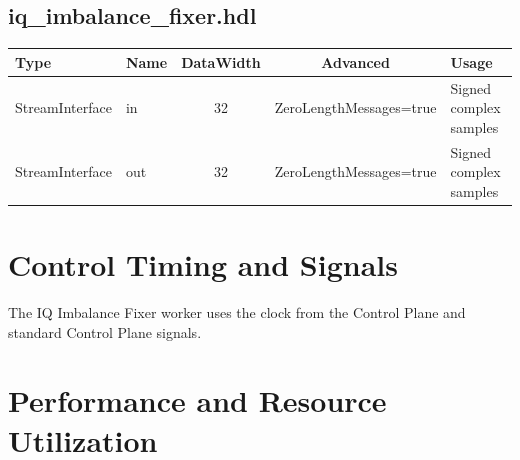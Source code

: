 \documentclass{article}
\def\comp{iq\_imbalance\_fixer}
\begin{document}
\begin{landscape}
		\subsection*{\comp.hdl}
		\begin{scriptsize}
			\begin{tabular}{|M{2cm}|M{1.5cm}|c|c|M{12cm}|}
				\hline
				Type            & Name & DataWidth & Advanced                & Usage                  \\
				\hline
				StreamInterface & in   & 32        & ZeroLengthMessages=true & Signed complex samples \\
				\hline
				StreamInterface & out  & 32        & ZeroLengthMessages=true & Signed complex samples \\
				\hline
			\end{tabular}
		\end{scriptsize}
	\end{landscape}

	\section*{Control Timing and Signals}
	\begin{flushleft}
		The IQ Imbalance Fixer worker uses the clock from the Control Plane and standard Control Plane signals.
	\end{flushleft}

	\section*{Performance and Resource Utilization}
\end{document}
